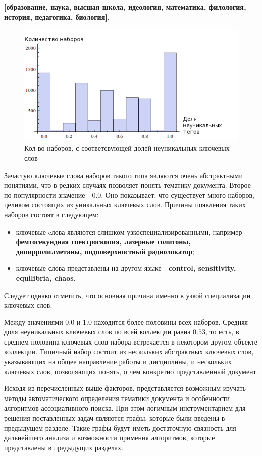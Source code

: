 \textbf{[образование, наука, высшая школа, идеология, математика, филология, история, педагогика, биология]}.

\begin{figure}[ht]
  \begin{minipage}[ht]{1.0\linewidth}\centering
    \includegraphics[width=0.5\linewidth]{Dissertation/pics/abstr_hist}
    \caption{Кол-во наборов, с соответсвующей долей неуникальных ключевых слов}
    \label{img:abstr_hist}
  \end{minipage}
\end{figure}

Зачастую ключевые слова наборов такого типа являются очень абстрактными понятиями, что в редких случаях позволяет понять тематику документа. Второе по популярности значение - 0.0. Оно показывает, что существует много наборов, целиком состоящих из уникальных ключевых слов. Причины появления таких наборов состоят в следующем:

\begin{itemize}
    \item ключевые cлова являются слишком узкоспециализированными, например - \textbf{фемтосекундная спектроскопия, лазерные солитоны, дипирролилметаны, подповерхностный радиолокатор};
    \item ключевые слова представлены на другом языке - \textbf{control, sensitivity, equilibria, chaos}.
\end{itemize}

Следует однако отметить, что основная причина именно в узкой специализации ключевых слов.

Между значениями $0.0$ и $1.0$ находится более половины всех наборов. Средняя доля неуникальных ключевых слов по всей коллекции равна $0.53$, то есть, в среднем половина ключевых слов набора встречается в некотором другом объекте коллекции. Типичный набор состоит из нескольких абстрактных ключевых слов, указывающих на общее направление работы и дисциплины, и нескольких ключевых слов, позволяющих понять, о чем конкретно представленный документ.

Исходя из перечисленных выше факторов, представляется возможным изучать методы автоматического определения тематики документа и особенности алгоритмов ассоциативного поиска. При этом логичным инструментарием для решения поставленных задач являются графы, которые были введены в предыдущем разделе. Такие графы будут иметь достаточную связность для дальнейшего анализа и возможности примения алгоритмов, которые представлены в предыдущих разделах.

